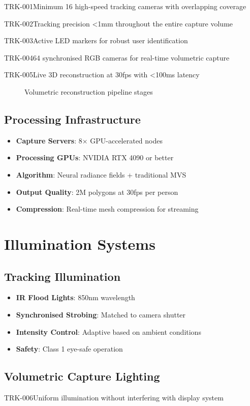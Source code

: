 \begin{requirement}{TRK-001}{Minimum 16 high-speed tracking cameras with overlapping coverage}
\begin{requirement}{TRK-002}{Tracking precision <1mm throughout the entire capture volume}
\begin{requirement}{TRK-003}{Active LED markers for robust user identification}
\begin{requirement}{TRK-004}{64 synchronised RGB cameras for real-time volumetric capture}
\begin{requirement}{TRK-005}{Live 3D reconstruction at 30fps with <100ms latency}
\begin{figure}[H]
\caption{Volumetric reconstruction pipeline stages}
\end{figure}

\subsection{Processing Infrastructure}

\begin{itemize}
    \item \textbf{Capture Servers}: 8× GPU-accelerated nodes
    \item \textbf{Processing GPUs}: NVIDIA RTX 4090 or better
    \item \textbf{Algorithm}: Neural radiance fields + traditional MVS
    \item \textbf{Output Quality}: 2M polygons at 30fps per person
    \item \textbf{Compression}: Real-time mesh compression for streaming
\end{itemize}

\section{Illumination Systems}

\subsection{Tracking Illumination}

\begin{itemize}
    \item \textbf{IR Flood Lights}: 850nm wavelength
    \item \textbf{Synchronised Strobing}: Matched to camera shutter
    \item \textbf{Intensity Control}: Adaptive based on ambient conditions
    \item \textbf{Safety}: Class 1 eye-safe operation
\end{itemize}

\subsection{Volumetric Capture Lighting}

\begin{requirement}{TRK-006}{Uniform illumination without interfering with display system}


\end{requirement}
\end{requirement}
\end{requirement}
\end{requirement}
\end{requirement}
\end{requirement}

